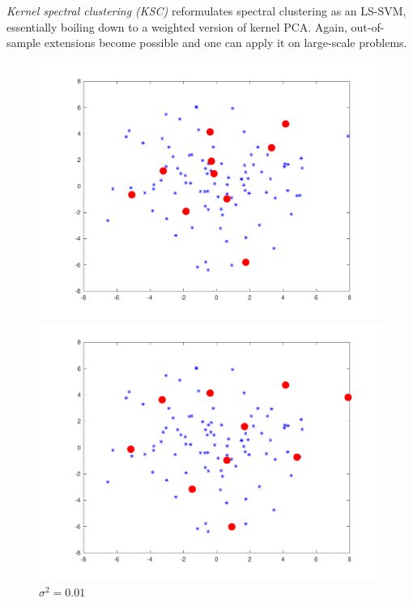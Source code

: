 \par \textit{Kernel spectral clustering (KSC)} reformulates spectral clustering as an LS-SVM, essentially boiling down to a weighted version of kernel PCA. Again, out-of-sample extensions become possible and one can apply it on large-scale problems. 

\begingroup
\setlength{\columnsep}{0.3cm}
\setlength{\intextsep}{0cm}
\begin{figure}
\vspace{-0.6cm}
\begin{minipage}{\linewidth}
    \centering\captionsetup[subfigure]{justification=centering}
    \includegraphics[width=\linewidth]{../src/figures/fixedsize/fixedsize_1}
    \caption*{$\sigma^2=0.01$}
\includegraphics[width=\linewidth]{../src/figures/fixedsize/fixedsize_10}

\end{minipage}
\end{figure}
